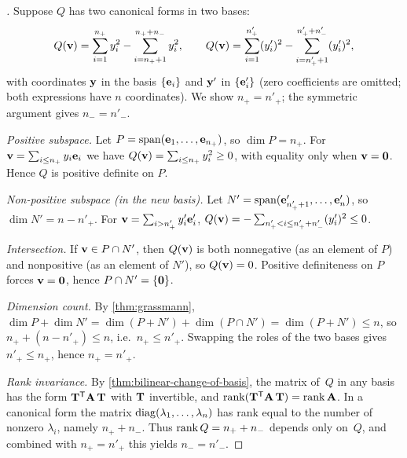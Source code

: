 \begin{proof}[]
Suppose $Q$ has two canonical forms in two bases:
\[
  Q(\mathbf{v}) = \sum_{i=1}^{n_+} y_i^2 - \sum_{i=n_+ + 1}^{n_+ + n_-} y_i^2,
  \qquad
  Q(\mathbf{v}) = \sum_{i=1}^{n'_+} (y'_i)^2 - \sum_{i=n'_+ + 1}^{n'_+ + n'_-} (y'_i)^2,
\]
with coordinates $\mathbf{y}$ in the basis $\{\mathbf{e}_i\}$ and
$\mathbf{y}'$ in $\{\mathbf{e}'_i\}$ (zero coefficients are omitted; both
expressions have $n$ coordinates). We show $n_+ = n'_+$; the
symmetric argument gives $n_- = n'_-$.

\emph{Positive subspace.} Let
$P = \operatorname{span}(\mathbf{e}_1, \dots, \mathbf{e}_{n_+})$, so $\dim P = n_+$. For
$\mathbf{v} = \sum_{i \le n_+} y_i \mathbf{e}_i$ we have
$Q(\mathbf{v}) = \sum_{i \le n_+} y_i^2 \ge 0$, with equality only when
$\mathbf{v} = \mathbf{0}$. Hence $Q$ is positive definite on $P$.

\emph{Non-positive subspace (in the new basis).} Let
$N' = \operatorname{span}(\mathbf{e}'_{n'_+ + 1}, \dots, \mathbf{e}'_n)$, so
$\dim N' = n - n'_+$. For
$\mathbf{v} = \sum_{i > n'_+} y'_i \mathbf{e}'_i$,
$Q(\mathbf{v}) = -\sum_{n'_+ < i \le n'_+ + n'_-} (y'_i)^2 \le 0$.

\emph{Intersection.} If $\mathbf{v} \in P \cap N'$, then $Q(\mathbf{v})$ is
both nonnegative (as an element of $P$) and nonpositive (as an element
of $N'$), so $Q(\mathbf{v}) = 0$. Positive definiteness on $P$ forces
$\mathbf{v} = \mathbf{0}$, hence $P \cap N' = \{\mathbf{0}\}$.

\emph{Dimension count.} By \cref{thm:grassmann},
$\dim P + \dim N' = \dim(P + N') + \dim(P \cap N') = \dim(P + N') \le n$,
so $n_+ + (n - n'_+) \le n$, i.e.\ $n_+ \le n'_+$. Swapping the roles
of the two bases gives $n'_+ \le n_+$, hence $n_+ = n'_+$.

\emph{Rank invariance.} By
\cref{thm:bilinear-change-of-basis}, the matrix of~$Q$ in any basis
has the form $\mathbf{T}^{\mathsf{T}} \mathbf{A}\, \mathbf{T}$ with $\mathbf{T}$ invertible,
and $\operatorname{rank}(\mathbf{T}^{\mathsf{T}} \mathbf{A}\, \mathbf{T}) = \operatorname{rank} \mathbf{A}$. In a
canonical form the matrix $\operatorname{diag}(\lambda_1, \dots, \lambda_n)$ has
rank equal to the number of nonzero $\lambda_i$, namely $n_+ + n_-$.
Thus $\operatorname{rank} Q = n_+ + n_-$ depends only on~$Q$, and combined with
$n_+ = n'_+$ this yields $n_- = n'_-$.
\end{proof}

